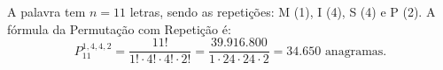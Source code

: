 \documentclass[12pt]{article}
\begin{document}
\begin{enumerate}
\vspace{0.2cm}
\begin{tcolorbox}[colback=white, colframe=maincolor, arc=2mm, boxrule=1pt, title=\textit{Resolução:}, coltitle=white, title filled=true]
A palavra tem $n = 11$ letras, sendo as repetições: M (1), I (4), S (4) e P (2). A fórmula da Permutação com Repetição é:
\[
P_{11}^{1,4,4,2} = \frac{11!}{1! \cdot 4! \cdot 4! \cdot 2!} = \frac{39.916.800}{1 \cdot 24 \cdot 24 \cdot 2} = \mathbf{34.650} \text{ anagramas.}
\]
\end{tcolorbox}


\end{enumerate}
\end{document}
